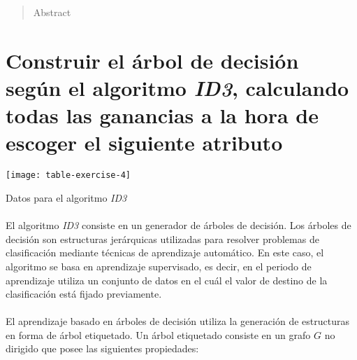 \documentclass[10pt, a4paper,spanish]{article}
\begin{document}
	\maketitle %

	\thispagestyle{fancy} %



	\begin{abstract}
		\noindent Abstract
	\end{abstract}


	\setcounter{section}{4}

	\section{Construir el árbol de decisión según el algoritmo \emph{ID3}, calculando todas las ganancias a la hora de escoger el siguiente atributo}

		\begin{table}[h]
			\begin{center}
				\texttt{[image: table-exercise-4]}
				\caption{Datos para el algoritmo \emph{ID3}}
			\end{center}
			\label{e4:table}
		\end{table}

		\paragraph{}
		El algoritmo \emph{ID3} consiste en un generador de árboles de decisión. Los árboles de decisión son estructuras jerárquicas utilizadas para resolver problemas de clasificación mediante técnicas de aprendizaje automático. En este caso, el algoritmo se basa en aprendizaje supervisado, es decir, en el periodo de aprendizaje utiliza un conjunto de datos en el cuál el valor de destino de la clasificación está fijado previamente.

		\paragraph{}
		El aprendizaje basado en árboles de decisión utiliza la generación de estructuras en forma de árbol etiquetado. Un árbol etiquetado consiste en un grafo $G$ no dirigido que posee las siguientes propiedades\cite{wiki:tree}:
\end{document}
